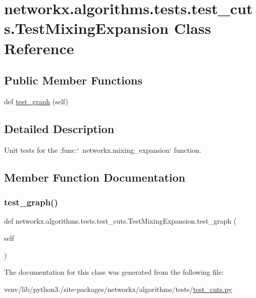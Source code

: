 \hypertarget{classnetworkx_1_1algorithms_1_1tests_1_1test__cuts_1_1TestMixingExpansion}{}\section{networkx.\+algorithms.\+tests.\+test\+\_\+cuts.\+Test\+Mixing\+Expansion Class Reference}
\label{classnetworkx_1_1algorithms_1_1tests_1_1test__cuts_1_1TestMixingExpansion}
\subsection*{Public Member Functions}
\begin{DoxyCompactItemize}
\item 
def \hyperlink{classnetworkx_1_1algorithms_1_1tests_1_1test__cuts_1_1TestMixingExpansion_a97324d2f115fef807c7408f767d44c11}{test\+\_\+graph} (self)
\end{DoxyCompactItemize}


\subsection{Detailed Description}
\begin{DoxyVerb}Unit tests for the :func:`~networkx.mixing_expansion` function.\end{DoxyVerb}
 

\subsection{Member Function Documentation}
\mbox{\label{classnetworkx_1_1algorithms_1_1tests_1_1test__cuts_1_1TestMixingExpansion_a97324d2f115fef807c7408f767d44c11}} 
\subsubsection{\texorpdfstring{test\+\_\+graph()}{test\_graph()}}
{\footnotesize\ttfamily def networkx.\+algorithms.\+tests.\+test\+\_\+cuts.\+Test\+Mixing\+Expansion.\+test\+\_\+graph (\begin{DoxyParamCaption}\item[{}]{self }\end{DoxyParamCaption})}



The documentation for this class was generated from the following file\+:\begin{DoxyCompactItemize}
\item 
venv/lib/python3./site-\/packages/networkx/algorithms/tests/\hyperlink{tests_2test__cuts_8py}{test\+\_\+cuts.\+py}\end{DoxyCompactItemize}
